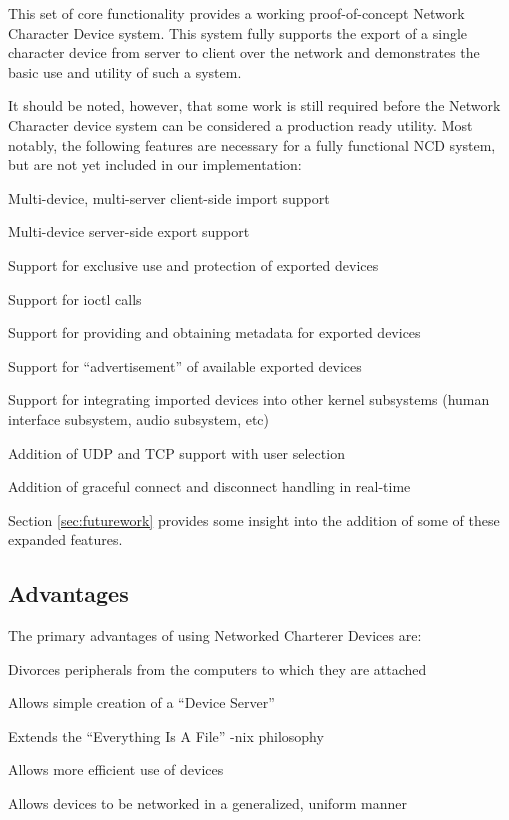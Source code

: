 \documentclass[11pt,twocolumn]{article}
\newenvironment{packed_item}{
\begin{itemize}
  \setlength{\itemsep}{1pt}
  \setlength{\parskip}{0pt}
  \setlength{\parsep}{0pt}
}{\end{itemize}}
\begin{document}
This set of core functionality provides a working proof-of-concept
Network Character Device system. This system fully supports the
export of a single character device from server to client over the
network and demonstrates the basic use and utility of such a system.

It should be noted, however, that some work is still required before
the Network Character device system can be considered a production
ready utility. Most notably, the following features are necessary for
a fully functional NCD system, but are not yet included in our
implementation:

\begin{packed_item}
\item Multi-device, multi-server client-side import support
\item Multi-device server-side export support
\item Support for exclusive use and protection of exported devices
\item Support for ioctl calls
\item Support for providing and obtaining metadata for exported
  devices
\item Support for ``advertisement'' of available exported devices
\item Support for integrating imported devices into other kernel
  subsystems (human interface subsystem, audio subsystem, etc)
\item Addition of UDP and TCP support with user selection
\item Addition of graceful connect and disconnect handling in real-time
\end{packed_item}

Section \ref{sec:futurework} provides some insight into the addition
of some of these expanded features.

\subsection{Advantages}
\label{sec:advantages}

The primary advantages of using Networked Charterer Devices are:

\begin{packed_item}
\item Divorces peripherals from the computers to which they are
  attached
\item Allows simple creation of a ``Device Server''
\item Extends the ``Everything Is A File'' -nix philosophy
\item Allows more efficient use of devices
\item Allows devices to be networked in a generalized, uniform manner
\end{packed_item}
\end{document}
